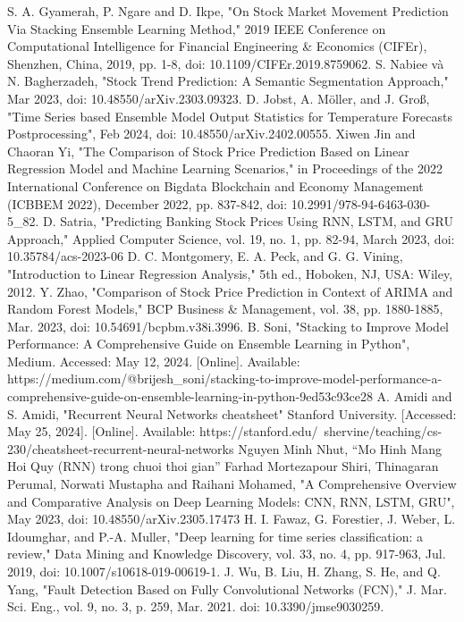 \documentclass{ieeeojies}
\begin{document}
\begin{thebibliography}{00}
 S. A. Gyamerah, P. Ngare and D. Ikpe, "On Stock Market Movement Prediction Via Stacking Ensemble Learning Method," 2019 IEEE Conference on Computational Intelligence for Financial Engineering \& Economics (CIFEr), Shenzhen, China, 2019, pp. 1-8, doi: 10.1109/CIFEr.2019.8759062.
 S. Nabiee và N. Bagherzadeh, "Stock Trend Prediction: A Semantic Segmentation Approach,"  Mar 2023, doi: 10.48550/arXiv.2303.09323.
 D. Jobst, A. Möller, and J. Groß, "Time Series based Ensemble Model Output Statistics for Temperature Forecasts Postprocessing", Feb 2024, doi: 10.48550/arXiv.2402.00555.
 Xiwen Jin and Chaoran Yi, "The Comparison of Stock Price Prediction Based on Linear Regression Model and Machine Learning Scenarios," in Proceedings of the 2022 International Conference on Bigdata Blockchain and Economy Management (ICBBEM 2022), December 2022, pp. 837-842, doi: 10.2991/978-94-6463-030-5\_82.
 D. Satria, "Predicting Banking Stock Prices Using RNN, LSTM, and GRU Approach," Applied Computer Science, vol. 19, no. 1, pp. 82-94, March 2023, doi: 10.35784/acs-2023-06
 D. C. Montgomery, E. A. Peck, and G. G. Vining, "Introduction to Linear Regression Analysis," 5th ed., Hoboken, NJ, USA: Wiley, 2012.
 Y. Zhao, "Comparison of Stock Price Prediction in Context of ARIMA and Random Forest Models," BCP Business \& Management, vol. 38, pp. 1880-1885, Mar. 2023, doi: 10.54691/bcpbm.v38i.3996.
 B. Soni, "Stacking to Improve Model Performance: A Comprehensive Guide on Ensemble Learning in Python", Medium. Accessed: May 12, 2024. [Online]. Available: https://medium.com/@brijesh\_soni/stacking-to-improve-model-performance-a-comprehensive-guide-on-ensemble-learning-in-python-9ed53c93ce28
 A. Amidi and S. Amidi, "Recurrent Neural Networks cheatsheet" Stanford University. [Accessed: May 25, 2024]. [Online]. Available: https://stanford.edu/~shervine/teaching/cs-230/cheatsheet-recurrent-neural-networks
 Nguyen Minh Nhut, “Mo Hinh Mang Hoi Quy (RNN) trong chuoi thoi gian”
 Farhad Mortezapour Shiri, Thinagaran Perumal, Norwati Mustapha and Raihani Mohamed, "A Comprehensive Overview and Comparative Analysis on Deep Learning Models: CNN, RNN, LSTM, GRU", May 2023, doi: 10.48550/arXiv.2305.17473
 H. I. Fawaz, G. Forestier, J. Weber, L. Idoumghar, and P.-A. Muller, "Deep learning for time series classification: a review," Data Mining and Knowledge Discovery, vol. 33, no. 4, pp. 917-963, Jul. 2019, doi: 10.1007/s10618-019-00619-1.
 J. Wu, B. Liu, H. Zhang, S. He, and Q. Yang, "Fault Detection Based on Fully Convolutional Networks (FCN)," J. Mar. Sci. Eng., vol. 9, no. 3, p. 259, Mar. 2021. doi: 10.3390/jmse9030259.
\end{thebibliography}
\EOD
\end{document}
